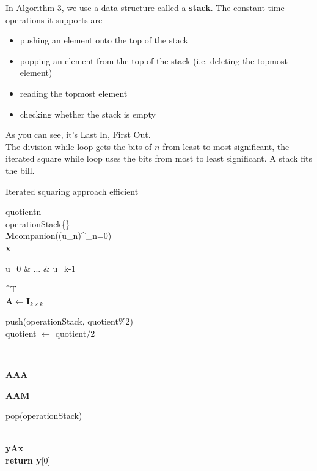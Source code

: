 \documentclass[a4paper,12pt]{article}
\numberwithin{definition}{section}
\numberwithin{mytheorem}{subsection}
\begin{document}
In Algorithm 3, we use a data structure called a \textbf{stack}. The constant time operations it supports
are
\begin{itemize}
\item pushing an element onto the top of the stack
\item popping an element from the top of the stack (i.e. deleting the topmost element)
\item reading the topmost element
\item checking whether the stack is empty
\end{itemize}
As you can see, it’s Last In, First Out.\\
The division while loop gets the bits of $n$ from least to most significant, the iterated square while
loop uses the bits from most to least significant. A stack fits the bill.\\
\begin{algorithm}[ht]
\caption{Iterated squaring approach \textsf{efficient}}
\SetAlgoLined
\DontPrintSemicolon
{}
\textsf{quotient}\longleftarrow n\\
\textsf{operationStack}\longleftarrow \{\}\\
\textbf{M}\longleftarrow \textsf{companion}((u_n)^\infty_{n=0})\\
\textbf{x}\longleftarrow \begin{bmatrix} u_0 & ... & u_{k-1} \end{bmatrix}^{T}\\
\textbf{A}$\longleftarrow$$\textbf{I}_{k\times k}$\\



{
    \textsf{push(operationStack, quotient\%2)\\
    quotient $\longleftarrow$ quotient/2}

}\\
\EndWhile

{
    \textbf{A}\longleftarrow\textbf{A}\cdot\textbf{A}\\
    {
                {
                    \textbf{A}\longleftarrow\textbf{A}\cdot\textbf{M}\\
                }
           \EndIf
        
     }
    \textsf{pop(operationStack)}\\  
}       


        
    
      



\EndWhile

\\
\textbf{y}\longleftarrow\textbf{Ax}\\
\textbf{return y}[0] 


\end{algorithm}
\\
\end{document}
